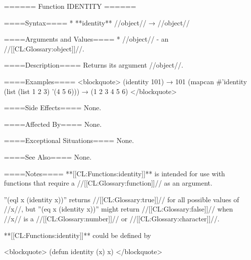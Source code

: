 ====== Function IDENTITY ======

====Syntax====
  * **identity** //object// → //object//

====Arguments and Values====
  * //object// - an //[[CL:Glossary:object]]//.

====Description====
Returns its argument //object//.

====Examples====
<blockquote> (identity 101) → 101 (mapcan #'identity (list (list 1 2 3) '(4 5 6))) → (1 2 3 4 5 6) </blockquote>

====Side Effects====
None.

====Affected By====
None.

====Exceptional Situations====
None.

====See Also====
None.

====Notes====
**[[CL:Functions:identity]]** is intended for use with functions that require a //[[CL:Glossary:function]]// as an argument.

''(eql x (identity x))'' returns //[[CL:Glossary:true]]// for all possible values of //x//, but ''(eq x (identity x))'' might return //[[CL:Glossary:false]]// when //x// is a //[[CL:Glossary:number]]// or //[[CL:Glossary:character]]//.

**[[CL:Functions:identity]]** could be defined by

<blockquote> (defun identity (x) x) </blockquote>


